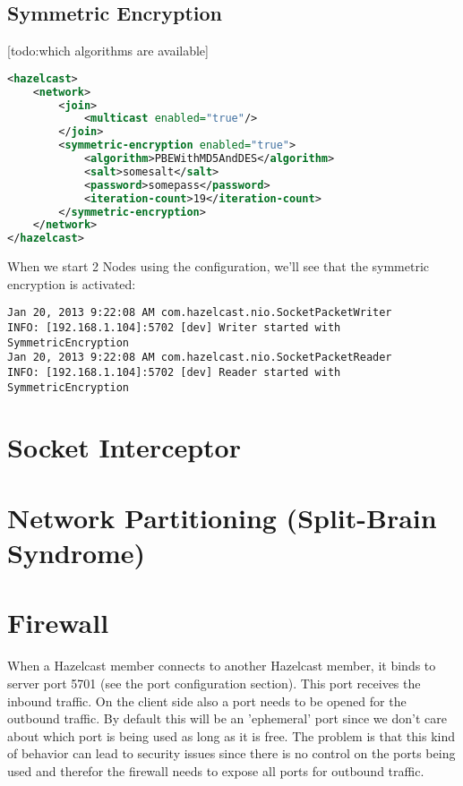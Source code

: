 \subsection{Symmetric Encryption}
[todo:which algorithms are available]

\begin{lstlisting}[language=xml]
<hazelcast>
    <network>
        <join>
            <multicast enabled="true"/>
        </join>
        <symmetric-encryption enabled="true">
            <algorithm>PBEWithMD5AndDES</algorithm>
            <salt>somesalt</salt>
            <password>somepass</password>
            <iteration-count>19</iteration-count>
        </symmetric-encryption>
    </network>
</hazelcast>
\end{lstlisting}
When we start 2 Nodes using the configuration, we'll see that the symmetric encryption is activated:
\begin{lstlisting}
Jan 20, 2013 9:22:08 AM com.hazelcast.nio.SocketPacketWriter
INFO: [192.168.1.104]:5702 [dev] Writer started with SymmetricEncryption
Jan 20, 2013 9:22:08 AM com.hazelcast.nio.SocketPacketReader
INFO: [192.168.1.104]:5702 [dev] Reader started with SymmetricEncryption
\end{lstlisting}

\section{Socket Interceptor}

\section{Network Partitioning (Split-Brain Syndrome)}

\section{Firewall}
When a Hazelcast member connects to another Hazelcast member, it binds to server port 5701 (see the port configuration section). This port receives the inbound traffic. On the client side also a port needs to be opened for the outbound traffic. By default this will be an 'ephemeral' port since we don't care about which port is being used as long as it is free. The problem is that this kind of behavior can lead to security issues since there is no control on the ports being used and therefor the firewall needs to expose all ports for outbound traffic. 

